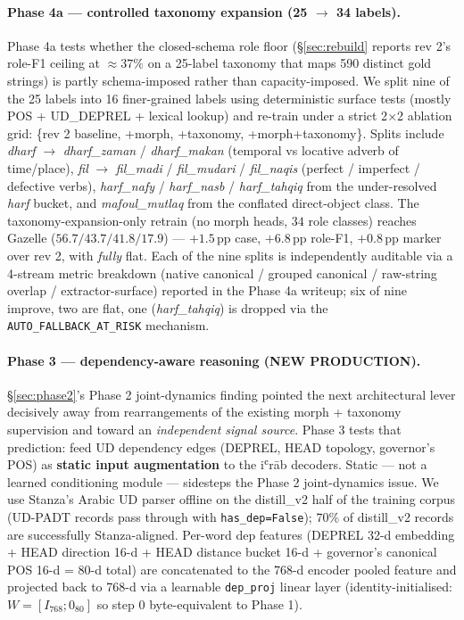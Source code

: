 \documentclass[10pt,a4paper,twocolumn]{article}
\begin{document}
\paragraph{Phase 4a --- controlled taxonomy expansion (25 $\rightarrow$ 34 labels).}
\label{sec:phase4a}
Phase 4a tests whether the closed-schema role floor (\S\ref{sec:rebuild} reports rev 2's role-F1 ceiling at $\approx 37\%$ on a 25-label taxonomy that maps 590 distinct gold strings) is partly schema-imposed rather than capacity-imposed. We split nine of the 25 labels into 16 finer-grained labels using deterministic surface tests (mostly POS + UD\_DEPREL + lexical lookup) and re-train under a strict 2$\times$2 ablation grid: \{rev 2 baseline, +morph, +taxonomy, +morph+taxonomy\}. Splits include \emph{dharf} $\rightarrow$ \emph{dharf\_zaman} / \emph{dharf\_makan} (temporal vs locative adverb of time/place), \emph{fil} $\rightarrow$ \emph{fil\_madi} / \emph{fil\_mudari} / \emph{fil\_naqis} (perfect / imperfect / defective verbs), \emph{harf\_nafy} / \emph{harf\_nasb} / \emph{harf\_tahqiq} from the under-resolved \emph{harf} bucket, and \emph{mafoul\_mutlaq} from the conflated direct-object class. The taxonomy-expansion-only retrain (no morph heads, $34$ role classes) reaches Gazelle ($\mathbf{56.7} / \mathbf{43.7} / \mathbf{41.8} / 17.9$) --- $+1.5$\,pp case, $+6.8$\,pp role-F1, $+0.8$\,pp marker over rev 2, with \emph{fully} flat. Each of the nine splits is independently auditable via a 4-stream metric breakdown (native canonical / grouped canonical / raw-string overlap / extractor-surface) reported in the Phase 4a writeup; six of nine improve, two are flat, one (\emph{harf\_tahqiq}) is dropped via the \texttt{AUTO\_FALLBACK\_AT\_RISK} mechanism.

\paragraph{Phase 3 --- dependency-aware reasoning (NEW PRODUCTION).}
\label{sec:phase3}
\S\ref{sec:phase2}'s Phase 2 joint-dynamics finding pointed the next architectural lever decisively away from rearrangements of the existing morph + taxonomy supervision and toward an \emph{independent signal source}. Phase 3 tests that prediction: feed UD dependency edges (DEPREL, HEAD topology, governor's POS) as \textbf{static input augmentation} to the iʿrāb decoders. Static --- not a learned conditioning module --- sidesteps the Phase 2 joint-dynamics issue. We use Stanza's Arabic UD parser offline on the distill\_v2 half of the training corpus (UD-PADT records pass through with \texttt{has\_dep=False}); 70\% of distill\_v2 records are successfully Stanza-aligned. Per-word dep features (DEPREL 32-d embedding + HEAD direction 16-d + HEAD distance bucket 16-d + governor's canonical POS 16-d = 80-d total) are concatenated to the 768-d encoder pooled feature and projected back to 768-d via a learnable \texttt{dep\_proj} linear layer (identity-initialised: $W = [I_{768}; 0_{80}]$ so step 0 byte-equivalent to Phase 1).
\end{document}

